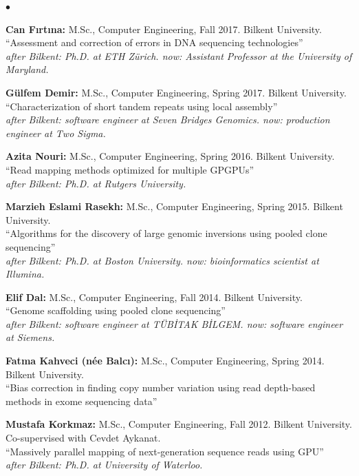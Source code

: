 \documentclass[margin,line]{res}
\newenvironment{list2}{
  \begin{list}{$\bullet$}{%
      \setlength{\itemsep}{0.1cm}
      \setlength{\parsep}{0in} \setlength{\parskip}{0in}
      \setlength{\topsep}{0in} \setlength{\partopsep}{0in} 
      \setlength{\leftmargin}{0.2in}}}{\end{list}}
\begin{document}
\begin{resume}
\begin{list2}
\item
  {\bf Can Fırtına:} M.Sc., Computer Engineering,  Fall 2017.
  Bilkent University. \\
  ``Assessment and correction of errors in DNA sequencing technologies''\\
  {\it after Bilkent: Ph.D. at ETH Zürich. now: Assistant Professor at the University of Maryland.}
\item
  {\bf Gülfem Demir:} M.Sc., Computer Engineering, Spring 2017.
  Bilkent University. \\
  ``Characterization of short tandem repeats using local assembly''\\
  {\it after Bilkent: software engineer at Seven Bridges Genomics. now: production engineer at Two Sigma.}
\item
  {\bf Azita Nouri:} M.Sc., Computer Engineering, Spring 2016.
  Bilkent University.\\
  ``Read mapping methods optimized for multiple GPGPUs''\\
  {\it after Bilkent: Ph.D. at Rutgers University.}
\item
  {\bf Marzieh Eslami Rasekh:} M.Sc., Computer Engineering, Spring 2015.
  Bilkent University.\\
  ``Algorithms for the discovery of large genomic inversions using pooled clone sequencing''\\
  {\it after Bilkent: Ph.D. at Boston University. now: bioinformatics scientist at Illumina.}
\item
  {\bf Elif Dal:} M.Sc., Computer Engineering, Fall 2014.
  Bilkent University.\\
  ``Genome scaffolding using pooled clone sequencing''\\
  {\it after Bilkent: software engineer at TÜBİTAK BİLGEM. now: software engineer at Siemens.}

\item
  {\bf Fatma Kahveci (n\'{e}e Balc{\i}):} M.Sc., Computer Engineering, Spring 2014.
  Bilkent University.\\
  ``Bias correction in finding copy number variation using read depth-based methods in exome sequencing data''
\item
 {\bf Mustafa Korkmaz:} M.Sc., Computer Engineering, Fall 2012.
  Bilkent University. \\ Co-supervised with Cevdet Aykanat.\\
  ``Massively parallel mapping of next-generation sequence reads using GPU''\\
  {\it after Bilkent: Ph.D. at University of Waterloo.}
\end{list2}
\vspace*{-.4cm}

\end{resume}
\end{document}
